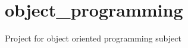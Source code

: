 \chapter{object\+\_\+programming}
\label{md__r_e_a_d_m_e}
\label{md__r_e_a_d_m_e_autotoc_md0}%


Project for object oriented programming subject 